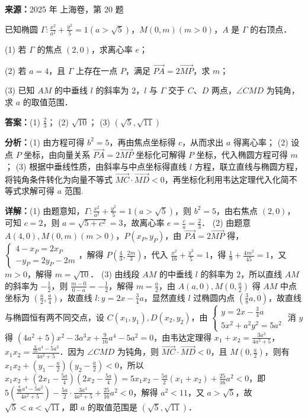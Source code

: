 \begin{question}[points=18]
\textbf{来源：}2025 年 上海卷，第 20 题\par
已知椭圆 $\Gamma: \frac{x^2}{a^2} + \frac{y^2}{5} = 1 (a > \sqrt{5})$，$M(0, m) (m > 0)$，$A$ 是 $\Gamma$ 的右顶点．

(1) 若 $\Gamma$ 的焦点 $(2,0)$，求离心率 $e$；

(2) 若 $a = 4$，且 $\Gamma$ 上存在一点 $P$，满足 $\overrightarrow{PA} = 2\overrightarrow{MP}$，求 $m$；

(3) 已知 $AM$ 的中垂线 $l$ 的斜率为 $2$，$l$ 与 $\Gamma$ 交于 $C$、$D$ 两点，$\angle CMD$ 为钝角，求 $a$ 的取值范围．
\begin{solution}
\textbf{答案：}(1) $\frac{2}{3}$； (2) $\sqrt{10}$； (3) $(\sqrt{5}, \sqrt{11})$

\textbf{分析：}(1) 由方程可得 $b^2 = 5$，再由焦点坐标得 $c$，从而求出 $a$ 得离心率； (2) 设点 $P$ 坐标，由向量关系 $\overrightarrow{PA} = 2\overrightarrow{MP}$ 坐标化可解得 $P$ 坐标，代入椭圆方程可得 $m$； (3) 根据中垂线性质，由斜率与中点坐标得直线 $l$ 方程，联立直线与椭圆方程，将钝角条件转化为向量不等式 $\overrightarrow{MC} \cdot \overrightarrow{MD} < 0$，再坐标化利用韦达定理代入化简不等式求解可得 $a$ 范围.

\textbf{详解：}(1) 由题意知，$\Gamma: \frac{x^2}{a^2} + \frac{y^2}{5} = 1 (a > \sqrt{5})$，则 $b^2 = 5$，由右焦点 $(2,0)$，可知 $c = 2$，则 $a = \sqrt{5 + c^2} = 3$，故离心率 $e = \frac{c}{a} = \frac{2}{3}$．
(2) 由题意 $A(4,0), M(0, m) (m > 0)$，$P(x_P, y_P)$，由 $\overrightarrow{PA} = 2\overrightarrow{MP}$ 得，$\begin{cases} 4 - x_P = 2x_P \\ -y_P = 2y_P - 2m \end{cases}$，解得 $P\left(\frac{4}{3}, \frac{2m}{3}\right)$，代入 $\frac{x^2}{16} + \frac{y^2}{5} = 1$，得 $\frac{1}{9} + \frac{4m^2}{45} = 1$，又 $m > 0$，解得 $m = \sqrt{10}$．
(3) 由线段 $AM$ 的中垂线 $l$ 的斜率为 $2$，所以直线 $AM$ 的斜率为 $-\frac{1}{2}$，则 $\frac{m-0}{0-a} = -\frac{1}{2}$，解得 $m = \frac{a}{2}$，由 $A(a,0), M(0, \frac{a}{2})$ 得 $AM$ 中点坐标为 $(\frac{a}{2}, \frac{a}{4})$，故直线 $l: y = 2x - \frac{3}{4}a$，显然直线 $l$ 过椭圆内点 $(\frac{3}{8}a, 0)$，故直线与椭圆恒有两不同交点，设 $C(x_1, y_1), D(x_2, y_2)$，由 $\begin{cases} y = 2x - \frac{3}{4}a \\ 5x^2 + a^2 y^2 = 5a^2 \end{cases}$ 消 $y$ 得 $(4a^2 + 5)x^2 - 3a^3 x + \frac{9}{16}a^4 - 5a^2 = 0$，由韦达定理得 $x_1 + x_2 = \frac{3a^3}{4a^2 + 5}$，$x_1 x_2 = \frac{\frac{9}{16}a^4 - 5a^2}{4a^2 + 5}$．因为 $\angle CMD$ 为钝角，则 $\overrightarrow{MC} \cdot \overrightarrow{MD} < 0$，且 $M(0, \frac{a}{2})$，则有 $x_1 x_2 + (y_1 - \frac{a}{2})(y_2 - \frac{a}{2}) < 0$，所以 $x_1 x_2 + \left(2x_1 - \frac{5a}{4}\right)\left(2x_2 - \frac{5a}{4}\right) = 5x_1 x_2 - \frac{5a}{2}(x_1 + x_2) + \frac{25}{16}a^2 < 0$，即 $5\left(\frac{\frac{9}{16}a^4 - 5a^2}{4a^2 + 5}\right) - \frac{5a}{2} \cdot \frac{3a^3}{4a^2 + 5} + \frac{25}{16}a^2 < 0$，解得 $a^2 < 11$，又 $a > \sqrt{5}$，故 $\sqrt{5} < a < \sqrt{11}$，即 $a$ 的取值范围是 $(\sqrt{5}, \sqrt{11})$．
\end{solution}
\end{question}

